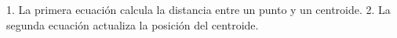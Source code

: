 \documentclass[preview]{standalone}
\begin{document}
\begin{center}
1. La primera ecuación calcula la distancia entre un punto y un centroide.
2. La segunda ecuación actualiza la posición del centroide.
\end{center}
\end{document}
